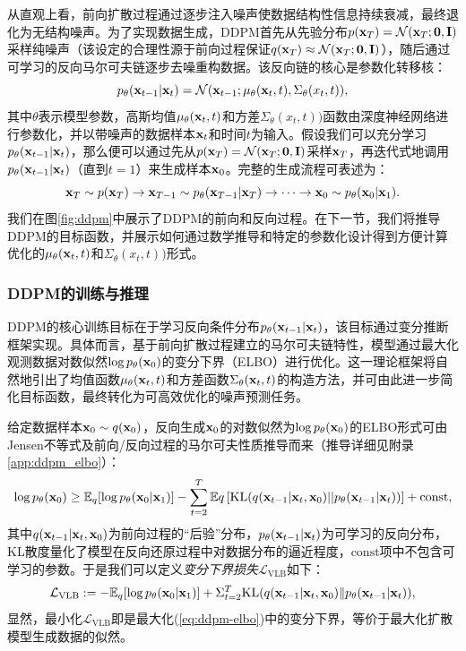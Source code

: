 \documentclass[11pt,a4paper,UTF8]{ctexart}
\begin{document}
从直观上看，前向扩散过程通过逐步注入噪声使数据结构性信息持续衰减，最终退化为无结构噪声。为了实现数据生成，DDPM首先从先验分布$p(\mathbf{x}_T)=\mathcal{N}(\mathbf{x}_T;\mathbf{0},\mathbf{I})$采样纯噪声（该设定的合理性源于前向过程保证$q(\mathbf{x}_T) \approx \mathcal{N}(\mathbf{x}_T; \mathbf{0}, \mathbf{I})$），随后通过可学习的反向马尔可夫链逐步去噪重构数据。该反向链的核心是参数化转移核：
\begin{equation}
    p_{\theta}(\mathbf{x}_{t-1}|\mathbf{x}_t) = \mathcal{N}(\mathbf{x}_{t-1};\mu_{\theta}(\mathbf{x}_t,t),\Sigma_{\theta}(x_t,t)),
\label{ddpm:reverse_gaussian}
\end{equation}
其中$\theta$表示模型参数，高斯均值$\mu_{\theta}(\mathbf{x}_t,t)$和方差$\Sigma_{\theta}(x_t,t))$函数由深度神经网络进行参数化，并以带噪声的数据样本$\mathbf{x}_t$和时间$t$为输入。假设我们可以充分学习$p_{\theta}(\mathbf{x}_{t-1}|\mathbf{x}_t)$，那么便可以通过先从$p(\mathbf{x}_T)=\mathcal{N}(\mathbf{x}_T;\mathbf{0},\mathbf{I})$采样$\mathbf{x}_T$，再迭代式地调用$p_{\theta}(\mathbf{x}_{t-1}|\mathbf{x}_t)$（直到$t=1$）来生成样本$\mathbf{x}_0$。完整的生成流程可表述为：
\begin{equation*}
\mathbf{x}_T \sim p(\mathbf{x}_T) \rightarrow \mathbf{x}_{T-1} \sim p_{\theta}(\mathbf{x}_{T-1}|\mathbf{x}_T) \rightarrow \cdots \rightarrow \mathbf{x}_0 \sim p_{\theta}(\mathbf{x}_0|\mathbf{x}_1).
\end{equation*}
我们在图\ref{fig:ddpm}中展示了DDPM的前向和反向过程。在下一节，我们将推导DDPM的目标函数，并展示如何通过数学推导和特定的参数化设计得到方便计算优化的$\mu_{\theta}(\mathbf{x}_t,t)$和$\Sigma_{\theta}(x_t,t))$形式。


\subsubsection{DDPM的训练与推理}

DDPM的核心训练目标在于学习反向条件分布$p_{\theta}(\mathbf{x}_{t-1}|\mathbf{x}_t)$，该目标通过变分推断框架实现\cite{sohldickstein2015diffusion}。具体而言，基于前向扩散过程建立的马尔可夫链特性，模型通过最大化观测数据对数似然$\log p_{\theta}(\mathbf{x}_0)$的变分下界（ELBO）进行优化。这一理论框架将自然地引出了均值函数$\mu_{\theta}(\mathbf{x}_t,t)$和方差函数$\Sigma_{\theta}(\mathbf{x}_t,t)$的构造方法，并可由此进一步简化目标函数，最终转化为可高效优化的噪声预测任务\cite{ho2020denoising}。

给定数据样本$\mathbf{x}_0\sim q(\mathbf{x}_0)$，反向生成$\mathbf{x}_0$的对数似然为$\log p_{\theta}(\mathbf{x}_0)$的ELBO形式可由Jensen不等式及前向/反向过程的马尔可夫性质推导而来（推导详细见附录\ref{app:ddpm_elbo}）：
\begin{equation}
\log p_{\theta}(\mathbf{x}_0) \geq \mathbb{E}_q[\log p_{\theta}(\mathbf{x}_0|\mathbf{x}_1)]  - \sum_{t=2}^{T} \mathbb{E}q \left[ \mathrm{KL} (q(\mathbf{x}_{t-1}|\mathbf{x}_t,\mathbf{x}_0)||p_\theta(\mathbf{x}_{t-1}|\mathbf{x}_t)) \right] + \text{const},
\label{eq:ddpm-elbo}
\end{equation}
其中$q(\mathbf{x}_{t-1}|\mathbf{x}_t,\mathbf{x}_0)$为前向过程的“后验”分布，$p_\theta(\mathbf{x}_{t-1}|\mathbf{x}_t)$为可学习的反向分布，KL散度量化了模型在反向还原过程中对数据分布的逼近程度，$\text{const}$项中不包含可学习的参数。于是我们可以定义\emph{变分下界损失}$\mathcal{L}_{\text{VLB}}$如下：
\begin{equation}
\mathcal{L}_{\text{VLB}} := -\mathbb{E}_q [\log p_{\theta}(\mathbf{x}_0|\mathbf{x}_1)] +  \Sigma_{t=2}^T \text{KL}(q(\mathbf{x}_{t-1}|\mathbf{x}_t,\mathbf{x}_0) \| p_{\theta}(\mathbf{x}_{t-1}|\mathbf{x}_t)),
\label{ddpm:loss_vlb}
\end{equation}
显然，最小化$\mathcal{L}_{\text{VLB}}$即是最大化(\ref{eq:ddpm-elbo})中的变分下界，等价于最大化扩散模型生成数据的似然。
\end{document}
